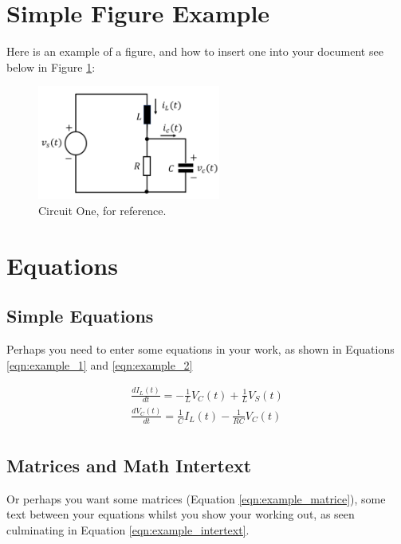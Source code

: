 \documentclass[11pt,a4paper,normalphoto,withhyper]{altareport}
\begin{document}
\section{Simple Figure Example}
Here is an example of a figure, and how to insert one into your document see below in Figure \ref{fig:Example_Figure_Circuit}:
\begin{figure}[h]
	\centering
	\includegraphics[width=6cm]{Images/CW3_Circuit_One.png}
	\caption{Circuit One, for reference.}  %
	\label{fig:Example_Figure_Circuit}
\end{figure}
\newpage


\section{Equations}
\subsection{Simple Equations}
Perhaps you need to enter some equations in your work, as shown in Equations \ref{eqn:example_1} and \ref{eqn:example_2}

\begin{gather} %
	\frac{dI_L(t)}{dt}=-\frac{1}{L}V_C(t)+\frac{1}{L}V_S(t)
	\label{eqn:example_1}\\
	\frac{dV_C(t)}{dt}=\frac{1}{C}I_L(t)-\frac{1}{RC}V_C(t)
	\label{eqn:example_2}\nonumber\\
\end{gather}


\subsection{Matrices and Math Intertext}
Or perhaps you want some matrices (Equation \ref{eqn:example_matrice}),  some text between your equations whilst you show your working out, as seen culminating in Equation \ref{eqn:example_intertext}.
\end{document}
